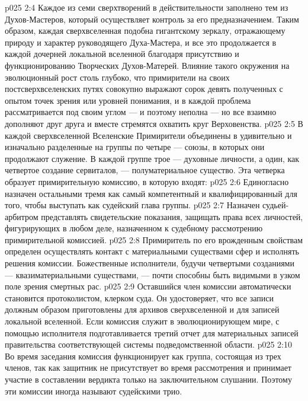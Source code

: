 \vs p025 2:4 Каждое из семи сверхтворений в действительности заполнено тем из Духов\hyp{}Мастеров, который осуществляет контроль за его предназначением. Таким образом, каждая сверхвселенная подобна гигантскому зеркалу, отражающему природу и характер руководящего Духа\hyp{}Мастера, и все это продолжается в каждой дочерней локальной вселенной благодаря присутствию и функционированию Творческих Духов\hyp{}Матерей. Влияние такого окружения на эволюционный рост столь глубоко, что примирители на своих постсверхвселенских путях совокупно выражают сорок девять полученных с опытом точек зрения или уровней понимания, и в каждой проблема рассматривается под своим углом --- и поэтому неполна --- но все взаимно дополняют друг друга и вместе стремятся охватить круг Верховенства.
\vs p025 2:5 \pc В каждой сверхвселенной Вселенские Примирители объединены в удивительно и изначально разделенные на группы по четыре --- союзы, в которых они продолжают служение. В каждой группе трое --- духовные личности, а один, как четвертое создание сервиталов, --- полуматериальное существо. Эта четверка образует примирительную комиссию, в которую входят:
\vs p025 2:6 \bibnobreakspace {} Единогласно назначен остальными тремя как самый компетентный и квалифицированный для того, чтобы выступать как судейский глава группы.
\vs p025 2:7 \pc {}\bibnobreakspace {} Назначен судьей\hyp{}арбитром представлять свидетельские показания, защищать права всех личностей, фигурирующих в любом деле, назначенном к судебному рассмотрению примирительной комиссией.
\vs p025 2:8 \pc {}\bibnobreakspace {} Примиритель по его врожденным свойствам определен осуществлять контакт с материальными существами сфер и исполнять решения комиссии. Божественные исполнители, будучи четвертыми созданиями --- квазиматериальными существами, --- почти способны быть видимыми в узком поле зрения смертных рас.
\vs p025 2:9 \pc {}\bibnobreakspace {} Оставшийся член комиссии автоматически становится протоколистом, клерком суда. Он удостоверяет, что все записи должным образом приготовлены для архивов сверхвселенной и для записей локальной вселенной. Если комиссия служит в эволюционирующем мире, с помощью исполнителя подготавливается третий отчет для материальных записей правительства соответствующей системы подведомственной области.
\vs p025 2:10 \pc Во время заседания комиссия функционирует как группа, состоящая из трех членов, так как защитник не присутствует во время рассмотрения и принимает участие в составлении вердикта только на заключительном слушании. Поэтому эти комиссии иногда называют судейскими трио.
